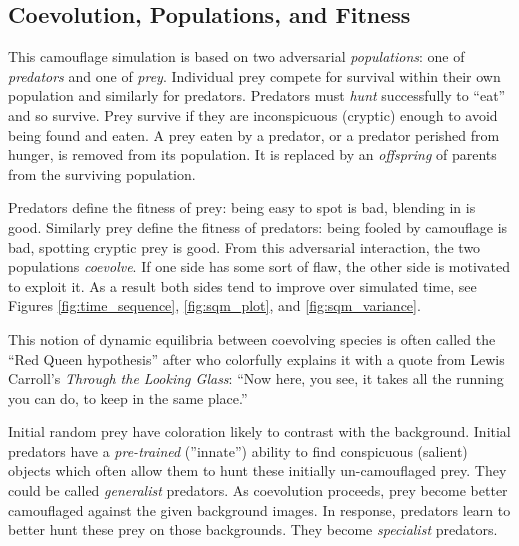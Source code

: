 \documentclass[letterpaper]{article}
\newcommand{\jargon}[1]{\textit{#1}}
\begin{document}
\subsection{Coevolution, Populations, and Fitness}
This camouflage simulation is based on two adversarial \jargon{populations}: one of \jargon{predators} and one of \jargon{prey}. Individual prey compete for survival within their own population and similarly for predators. Predators must \jargon{hunt} successfully to ``eat'' and so survive. Prey survive if they are inconspicuous (cryptic) enough to avoid being found and eaten. A prey eaten by a predator, or a predator perished from hunger, is removed from its population. It is replaced by an \jargon{offspring} of parents from the surviving population.
\par
Predators define the fitness of prey: being easy to spot is bad, blending in is good. Similarly prey define the fitness of predators: being fooled by camouflage is bad, spotting cryptic prey is good. From this adversarial interaction, the two populations \jargon{coevolve}. If one side has some sort of flaw, the other side is motivated to exploit it. As a result both sides tend to improve over simulated time, see Figures \ref{fig:time_sequence}, \ref{fig:sqm_plot}, and \ref{fig:sqm_variance}.
\par
This notion of dynamic equilibria between coevolving species is often called the ``Red Queen hypothesis'' after \citet{van_valen_new_1973} who colorfully explains it with a quote from Lewis Carroll's \textit{Through the Looking Glass}: ``Now here, you see, it takes all the running you can do, to keep in the same place.''
\par
Initial random prey have coloration likely to contrast with the background. Initial predators have a \jargon{pre-trained} (''innate'') ability to find conspicuous (salient) objects which often allow them to hunt these initially un-camouflaged prey. They could be called \jargon{generalist} predators. As coevolution proceeds, prey become better camouflaged against the given background images. In response, predators learn to better hunt these prey on those backgrounds. They become \jargon{specialist} predators.
\par

\end{document}
